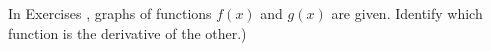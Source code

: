 {\noindent In Exercises}
{, graphs of functions $f(x)$ and $g(x)$ are given. Identify which function is the derivative of the other.)
}
